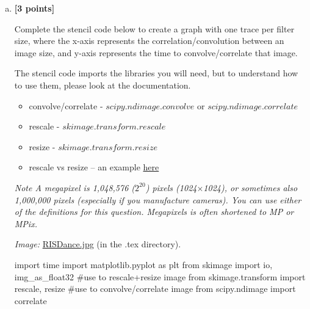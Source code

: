 \documentclass[11pt]{article}
\begin{document}
\begin{enumerate}[(a)]
\item
    \textbf{[3 points]}
    \begin{tcolorbox}[colback=orange!5!white,colframe=orange!75!black]
    Complete the stencil code below to create a graph with one trace per filter size, where the x-axis represents the correlation/convolution between an image size, and y-axis represents the time to convolve/correlate that image.

    The stencil code imports the libraries you will need, but to understand how to use them, please look at the documentation.
    
    \begin{itemize}
    \item convolve/correlate - \href{https://docs.scipy.org/doc/scipy/reference/generated/scipy.ndimage.convolve.html}{$scipy.ndimage.convolve$} or \href{https://docs.scipy.org/doc/scipy/reference/generated/scipy.ndimage.correlate.html}{$scipy.ndimage.correlate$}
    \item rescale - \href{https://scikit-image.org/docs/dev/api/skimage.transform.html#skimage.transform.rescale}{$skimage.transform.rescale$}
    \item resize - \href{https://scikit-image.org/docs/dev/api/skimage.transform.html#skimage.transform.resize}{$skimage.transform.resize$}
    \item rescale vs resize – an example \href{http://scikit-image.org/docs/dev/auto_examples/transform/plot_rescale.html}{here}
    \end{itemize}
    
    \end{tcolorbox}

\emph{Note A megapixel is 1,048,576 ($2^{20}$) pixels (1024$\times$1024), or sometimes also 1,000,000 pixels (especially if you manufacture cameras). You can use either of the definitions for this question. Megapixels is often shortened to MP or MPix.}

\emph{Image:} \href{RISDance.jpg}{RISDance.jpg} (in the .tex directory).

\begin{tcolorbox}[enhanced jigsaw,breakable,pad at break*=1mm,colback=white!5!white,colframe=green!75!black,height fixed for=all]

\begin{python}
import time
import matplotlib.pyplot as plt
from skimage import io, img_as_float32
#use to rescale+resize image
from skimage.transform import rescale, resize
#use to convolve/correlate image
from scipy.ndimage import correlate


\end{python}
\end{tcolorbox}
\end{enumerate}
\end{document}
